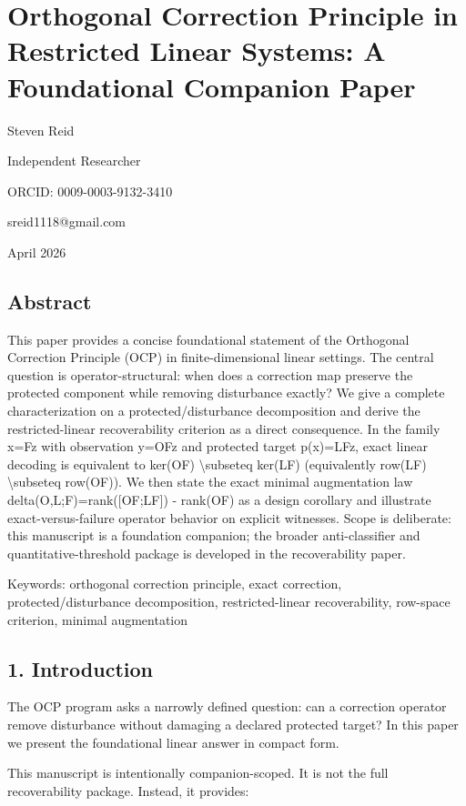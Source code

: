 \documentclass[11pt]{article}
\begin{document}
\section*{Orthogonal Correction Principle in Restricted Linear Systems: A Foundational Companion Paper}

Steven Reid

Independent Researcher

ORCID: 0009-0003-9132-3410

sreid1118@gmail.com

April 2026


\subsection*{Abstract}
This paper provides a concise foundational statement of the Orthogonal Correction Principle (OCP) in finite-dimensional linear settings. The central question is operator-structural: when does a correction map preserve the protected component while removing disturbance exactly? We give a complete characterization on a protected/disturbance decomposition and derive the restricted-linear recoverability criterion as a direct consequence. In the family x=Fz with observation y=OFz and protected target p(x)=LFz, exact linear decoding is equivalent to ker(OF) \textbackslash{}subseteq ker(LF) (equivalently row(LF) \textbackslash{}subseteq row(OF)). We then state the exact minimal augmentation law delta(O,L;F)=rank([OF;LF]) - rank(OF) as a design corollary and illustrate exact-versus-failure operator behavior on explicit witnesses. Scope is deliberate: this manuscript is a foundation companion; the broader anti-classifier and quantitative-threshold package is developed in the recoverability paper.


Keywords: orthogonal correction principle, exact correction, protected/disturbance decomposition, restricted-linear recoverability, row-space criterion, minimal augmentation


\subsection*{1. Introduction}
The OCP program asks a narrowly defined question: can a correction operator remove disturbance without damaging a declared protected target? In this paper we present the foundational linear answer in compact form.


This manuscript is intentionally companion-scoped. It is not the full recoverability package. Instead, it provides:
\end{document}
